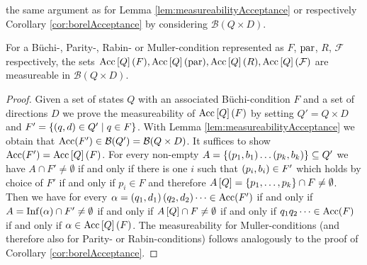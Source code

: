 the same argument as for Lemma \ref{lem:measureabilityAcceptance} or
respectively Corollary \ref{cor:borelAcceptance} by considering
$\mathcal{B}(Q\times D)$.
\begin{lemma}
  For a Büchi-, Parity-, Rabin- or Muller-condition represented as $F$, 
  $\operatorname{par}$, $R$, $\mathcal{F}$ respectively, the sets $\operatorname{Acc}\left[Q\right](F),
  \operatorname{Acc}\left[Q\right](\operatorname{par}),\operatorname{Acc}\left[Q\right](R),\operatorname{Acc}\left[Q\right](\mathcal{F})$
  are measureable in $\mathcal{B}(Q\times D)$.
  \label{lem:treeBorelAcceptance}
\end{lemma}
\begin{proof}
  Given a set of states $Q$ with an associated Büchi-condition $F$ and a set of 
  directions $D$ we prove the measureability of $\operatorname{Acc}\left[Q\right](F)$ by 
  setting $Q' = Q\times D$ and $F' = \left\{\left(q, d\right)\in Q'\mid q\in F\right\}$. With
  Lemma \ref{lem:measureabilityAcceptance} we obtain that 
  $\operatorname{Acc}(F')\in\mathcal{B}(Q') = \mathcal{B}(Q\times D)$. It suffices to show
  $\operatorname{Acc}(F') = \operatorname{Acc}\left[Q\right](F)$. For every non-empty
  $A = \left\{\left(p_{1},b_{1}\right)\dots\left(p_{k},b_{k}\right)\right\}\subseteq Q'$ we have
  $A\cap F'\neq\emptyset$ if and only if there is one $i$ such that 
  $\left(p_{i},b_{i}\right)\in F'$ which holds by choice of $F'$ if and only if
  $p_{i}\in F$ and therefore 
  $A\left[Q\right] = \left\{p_{1},\dots,p_{k}\right\}\cap F\neq\emptyset$. Then we have
  for every $\alpha = \left(q_{1},d_{1}\right)\left(q_{2},d_{2}\right)\dots\in\operatorname{Acc}(F')$ 
  if and only if $A = \operatorname{Inf}(\alpha)\cap F'\neq\emptyset$ if and only if 
  $A\left[Q\right]\cap F\neq\emptyset$ if and only if $q_{1}q_{2}\dots\in\operatorname{Acc}(F)$
  if and only if $\alpha\in\operatorname{Acc}\left[Q\right](F)$. The measureability for 
  Muller-conditions (and therefore also for Parity- or Rabin-conditions) 
  follows analogously to the proof of Corollary \ref{cor:borelAcceptance}.
\end{proof}

